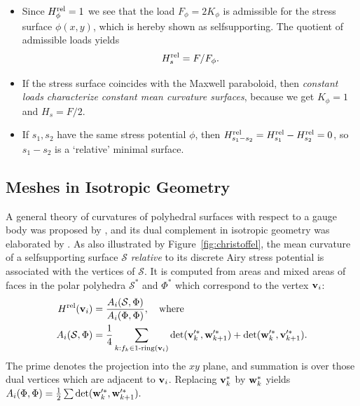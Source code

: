 \documentclass[annual]{acmsiggraph}
\def\rel{{\mathord{\text{\rm rel}}}}
\def\SS{{\mathcal S}}
\begin{document}
\begin{itemize}\itemsep-\parsep

\item Since $H^\rel_\phi=1$ we see that the load $F_\phi=2K_\phi$ is
admissible for the stress surface $\phi(x,y)$, which is hereby shown as
self\dash supporting. The quotient of admissible loads yields
	\begin{equation}
	 H_s^\rel = F/F_\phi. \label{equigeo2}
	\end{equation}

\item If the stress surface coincides with the Maxwell paraboloid, then
{\em constant loads characterize constant mean curvature surfaces},
because we get $K_\phi=1$ and $H_s=F/2$.

\item If $s_1,s_2$ have the same stress potential $\phi$, then
$H^\rel_{s_1-s_2}=H^\rel_{s_1}-H^\rel_{s_2}=0$, so $s_1-s_2$ is a
`relative' minimal surface.

\end{itemize}



\subsection{Meshes in Isotropic Geometry} \label{sec:discrete}

A general theory of curvatures of polyhedral surfaces with respect to a
gauge body was proposed by \cite{Pottmann2007b}, and its dual complement
in isotropic geometry was elaborated by \cite{Pottmann2007}. As also
illustrated by Figure~\ref{fig:christoffel}, the mean curvature of a
self\dash supporting surface $\SS$ {\em relative} to its discrete Airy
stress potential is associated with the vertices of $\SS$. It is computed
from areas and mixed areas of faces in the polar polyhedra $\SS^*$ and
$\Phi^*$ which correspond to the vertex ${\mathbf v}_i$:
	\begin{align*}
	H^\rel(\vw_i)
	&= {A_i(\SS,\Phi) \over A_i(\Phi,\Phi)},
	\quad\text{where}
	\\
		A_i (\SS,\Phi)
	&=
		\frac{1}{4}
		\sum_{k:f_k\in \text{1-ring}(\vw_i)}
		\det(\vw'^*_k, \ww'^*_{k+1})
		+ \det(\ww'^*_k, \vw'^*_{k+1}).
	\end{align*}
 The prime denotes the projection into the $xy$ plane, and summation is
over those dual vertices which are adjacent to ${\mathbf v}_i$.
Replacing ${\mathbf v}_k^*$ by ${\mathbf w}_k^*$ yields
	$
		A_i (\Phi,\Phi)
	=
	\frac{1}{2}
		\sum
		\det({\mathbf w}'^*_k, {\mathbf w}'^*_{k+1}).
	$
\end{document}
